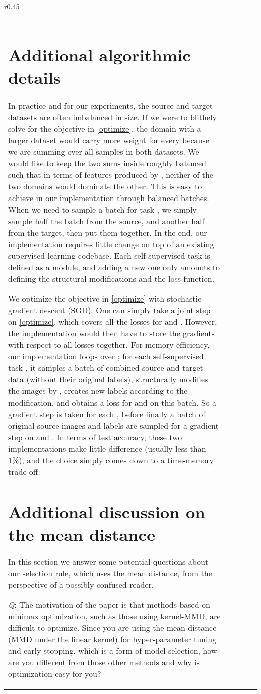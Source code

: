 \documentclass{article} \usepackage{iclr2020_conference,times}
\begin{document}
\begin{wraptable}{r}{0.45\textwidth}
\begin{tabular}{lcccc}
\section{Additional algorithmic details}
\label{practical}
In practice and for our experiments, the source and target datasets are often imbalanced in size. 
If we were to blithely solve for the objective in \autoref{optimize}, the domain with a larger dataset would carry more weight for every  because we are summing over all samples in both datasets. 
We would like to keep the two sums inside  roughly balanced such that in terms of features produced by , neither of the two domains would dominate the other. 
This is easy to achieve in our implementation through balanced batches. When we need to sample a batch for task , we simply sample half the batch from the source, and another half from the target, then put them together.
In the end, our implementation requires little change on top of an existing supervised learning codebase. Each self-supervised task is defined as a module, and adding a new one only amounts to defining the structural modifications and the loss function.

We optimize the objective in \autoref{optimize} with stochastic gradient descent (SGD). 
One can simply take a joint step on \autoref{optimize}, which covers all the losses for  and . 
However, the implementation would then have to store the gradients with respect to all  losses together.
For memory efficiency, our implementation loops over ; 
for each self-supervised task , it samples a batch of combined source and target data (without their original labels), structurally modifies the images by , creates new labels according to the modification, and obtains a loss for  and  on this batch. So a gradient step is taken for each , before finally a batch of original source images and labels are sampled for a gradient step on  and . 
In terms of test accuracy, these two implementations make little difference (usually less than 1\%), and the choice simply comes down to a time-memory trade-off.

\section{Additional discussion on the mean distance}
\label{additional_selection}
In this section we answer some potential questions about our selection rule, which uses the mean distance, from the perspective of a possibly confused reader.

\emph{Q}: 
The motivation of the paper is that methods based on minimax optimization, such as those using kernel-MMD, are difficult to optimize. Since you are using the mean distance (MMD under the linear kernel) for hyper-parameter tuning and early stopping, which is a form of model selection, how are you different from those other methods and why is optimization easy for you?


\end{tabular}
\end{wraptable}
\end{document}
